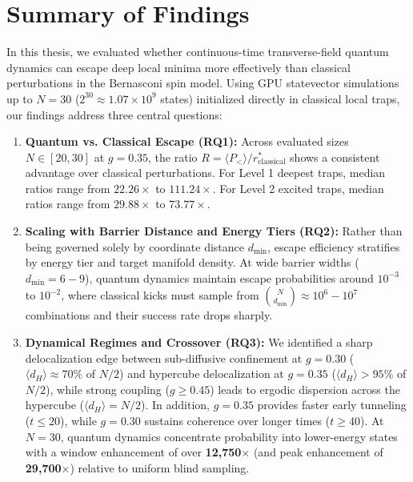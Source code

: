 \documentclass[12pt,a4paper]{report}
\begin{document}
\section{Summary of Findings}
\label{sec:conclusion_summary}
In this thesis, we evaluated whether continuous-time transverse-field quantum dynamics can escape deep local minima more effectively than classical perturbations in the Bernasconi spin model. Using GPU statevector simulations up to $N = 30$ ($2^{30} \approx 1.07 \times 10^9$ states) initialized directly in classical local traps, our findings address three central questions:
\begin{enumerate}
    \item \textbf{Quantum vs. Classical Escape (RQ1):} Across evaluated sizes $N \in [20, 30]$ at $g = 0.35$, the ratio $R = \langle P_< \rangle / r_{\mathrm{classical}}^*$ shows a consistent advantage over classical perturbations. For Level 1 deepest traps, median ratios range from $22.26\times$ to $111.24\times$. For Level 2 excited traps, median ratios range from $29.88\times$ to $73.77\times$.
    \item \textbf{Scaling with Barrier Distance and Energy Tiers (RQ2):} Rather than being governed solely by coordinate distance $d_{\min}$, escape efficiency stratifies by energy tier and target manifold density. At wide barrier widths ($d_{\min} = 6 - 9$), quantum dynamics maintain escape probabilities around $10^{-3}$ to $10^{-2}$, where classical kicks must sample from $\binom{N}{d_{\min}} \approx 10^6 - 10^7$ combinations and their success rate drops sharply.
    \item \textbf{Dynamical Regimes and Crossover (RQ3):} We identified a sharp delocalization edge between sub-diffusive confinement at $g = 0.30$ ($\langle d_H \rangle \approx 70\%$ of $N/2$) and hypercube delocalization at $g = 0.35$ ($\langle d_H \rangle > 95\%$ of $N/2$), while strong coupling ($g \ge 0.45$) leads to ergodic dispersion across the hypercube ($\langle d_H \rangle = N/2$). In addition, $g = 0.35$ provides faster early tunneling ($t \le 20$), while $g = 0.30$ sustains coherence over longer times ($t \ge 40$). At $N = 30$, quantum dynamics concentrate probability into lower-energy states with a window enhancement of over \textbf{12{,}750$\times$} (and peak enhancement of \textbf{29{,}700$\times$}) relative to uniform blind sampling.
\end{enumerate}
\end{document}
